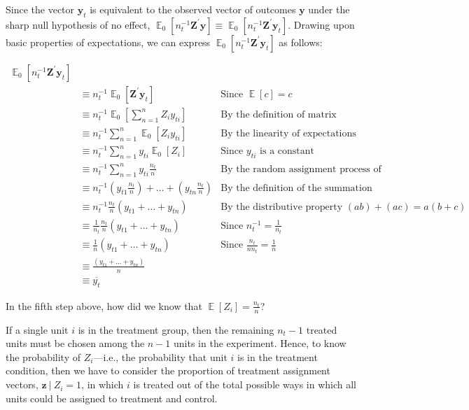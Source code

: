 \documentclass[11pt]{article}\usepackage[]{graphicx}\usepackage[]{color}
\theoremstyle{newstyle}
\newcommand\given[1][]{\:#1\vert\:}
\DeclareMathOperator{\E}{\mathbb{E}}
\begin{document}
Since the vector $\mathbf{y}_t$ is equivalent to the observed vector of outcomes $\mathbf{y}$ under the sharp null hypothesis of no effect, $\E_0\left[n_t^{-1} \mathbf{Z}^{\prime}\mathbf{y}\right] \equiv \E_0\left[n_t^{-1} \mathbf{Z}^{\prime}\mathbf{y}_t\right]$. Drawing upon basic properties of expectations, we can express $\E_0\left[n_t^{-1} \mathbf{Z}^{\prime}\mathbf{y}_t\right]$ as follows:

\begin{align*}
\E_0\left[n_t^{-1} \mathbf{Z}^{\prime}\mathbf{y}_t\right] \\
& \equiv n_t^{-1} \E_0\left[\mathbf{Z}^{\prime}\mathbf{y}_t\right] & \text{Since } \E\left[c\right] = c \\
& \equiv n_t^{-1} \E_0\left[\sum \limits_{n = 1}^n Z_i y_{ti}\right] & \text{By the definition of matrix multiplication} \\
& \equiv n_t^{-1} \sum \limits_{n = 1}^n \E_0\left[Z_i y_{ti}\right] & \text{By the linearity of expectations} \\
& \equiv n_t^{-1} \sum \limits_{n = 1}^n y_{ti} \E_0\left[Z_i\right] & \text{Since } y_{ti} \text{ is a constant} \\
& \equiv n_t^{-1} \sum \limits_{n = 1}^n y_{ti} \frac{n_t}{n} & \text{By the random assignment process of the experiment} \\
& \equiv n_t^{-1}  \left(y_{t1} \frac{n_t}{n}\right) + \dots + \left(y_{tn} \frac{n_t}{n}\right) & \text{By the definition of the summation operator} \\
& \equiv n_t^{-1} \frac{n_t}{n} \left(y_{t1} + \dots + y_{tn}\right) & \text{By the distributive property } (a b) + (a  c) = a(b + c) \\
& \equiv \frac{1}{n_t} \frac{n_t}{n} \left(y_{t1} + \dots + y_{tn}\right) & \text{Since } n_t^{-1} = \frac{1}{n_t} \\
& \equiv \frac{1}{n} \left(y_{t1} + \dots + y_{tn}\right) & \text{Since } \frac{n_t}{n n_t} = \frac{1}{n} \\
& \equiv \frac{\left(y_{t1} + \dots + y_{tn}\right)}{n} \\
& \equiv \overline{y_t}
\end{align*}

In the fifth step above, how did we know that $\E\left[Z_i\right] = \frac{n_t}{n}$?

If a single unit $i$ is in the treatment group, then the remaining $n_t - 1$ treated units must be chosen among the $n - 1$ units in the experiment. Hence, to know the probability of $Z_i$---i.e., the probability that unit $i$ is in the treatment condition, then we have to consider the proportion of treatment assignment vectors, $\mathbf{z} \given Z_i = 1$, in which $i$ is treated out of the total possible ways in which all units could be assigned to treatment and control.
\end{document}

